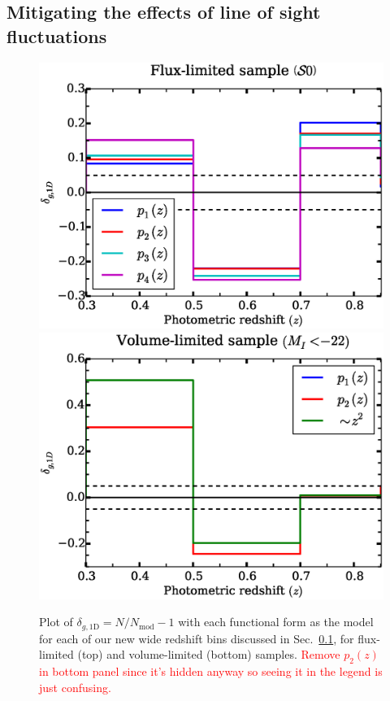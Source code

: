 \documentclass[twocolumn,useAMS,usenatbib]{mn2e}
\newcommand{\rachel}[1]{{\textcolor{red}{#1}}}
\begin{document}
\subsection{Mitigating the effects of line of sight fluctuations}\label{sec:mitigation}

\begin{figure}
 \centering
 \includegraphics[width=1.0\columnwidth]{redshift_fluxlimited_wide}
 \includegraphics[width=1.0\columnwidth]{redshift_vollimited_wide}
 \caption{Plot of $\delta_{g,\text{1D}} =  N/N_{\text{mod}}-1$ with each functional form as the model
           for each of our new wide redshift bins discussed in Sec.~\ref{sec:mitigation}, for flux-limited (top) and
           volume-limited (bottom) samples. \rachel{Remove $p_2(z)$
             in bottom panel since it's hidden anyway so seeing it in the legend is
             just confusing.}}
 \label{fig:redshift_wide}          
\end{figure}
\end{document}

